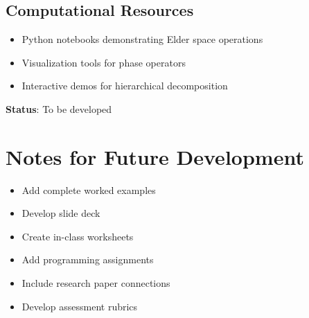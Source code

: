 \documentclass[12pt,a4paper]{article}
\begin{document}
\subsection{Computational Resources}

\begin{itemize}
    \item Python notebooks demonstrating Elder space operations
    \item Visualization tools for phase operators
    \item Interactive demos for hierarchical decomposition
\end{itemize}

\textbf{Status}: To be developed

\section{Notes for Future Development}

\begin{itemize}
    \item Add complete worked examples
    \item Develop slide deck
    \item Create in-class worksheets
    \item Add programming assignments
    \item Include research paper connections
    \item Develop assessment rubrics
\end{itemize}
\end{document}
